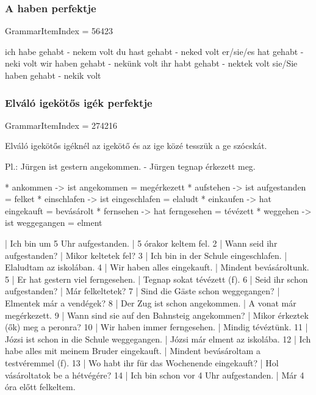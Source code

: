 \documentclass{article}
\newenvironment{desc}{\verbatim}{\endverbatim}
\newenvironment{exmp}{\verbatim}{\endverbatim}
\begin{document}
\subsubsection{A haben perfektje}

GrammarItemIndex = 56423

\begin{desc}

ich habe gehabt - nekem volt
du hast gehabt - neked volt
er/sie/es hat gehabt - neki volt
wir haben gehabt - nekünk volt
ihr habt gehabt - nektek volt
sie/Sie haben gehabt - nekik volt

\end{desc}

\begin{exmp}
\end{exmp}

\subsubsection{Elváló igekötős igék perfektje}

GrammarItemIndex = 274216

\begin{desc}
Elváló igekötős igéknél az igekötő és az ige közé tesszük a ge szócskát.

Pl.: Jürgen ist gestern angekommen. - Jürgen tegnap érkezett meg.

* ankommen -> ist angekommen = megérkezett
* aufstehen -> ist aufgestanden = felket
* einschlafen -> ist eingeschlafen = elaludt
* einkaufen -> hat eingekauft = bevásárolt
* fernsehen -> hat ferngesehen = tévézett
* weggehen -> ist weggegangen = elment
\end{desc}

\begin{exmp}
1 | Ich bin um 5 Uhr aufgestanden. | 5 órakor keltem fel.
2 | Wann seid ihr aufgestanden? | Mikor keltetek fel?
3 | Ich bin in der Schule eingeschlafen. | Elaludtam az iskolában.
4 | Wir haben alles eingekauft. | Mindent bevásároltunk.
5 | Er hat gestern viel ferngesehen. | Tegnap sokat tévézett (f).
6 | Seid ihr schon aufgestanden? | Már felkeltetek?
7 | Sind die Gäste schon weggegangen? | Elmentek már a vendégek?
8 | Der Zug ist schon angekommen. | A vonat már megérkezett.
9 | Wann sind sie auf den Bahnsteig angekommen? | Mikor érkeztek (ők) meg a peronra?
10 | Wir haben immer ferngesehen. | Mindig tévéztünk.
11 | Józsi ist schon in die Schule weggegangen. | Józsi már elment az iskolába.
12 | Ich habe alles mit meinem Bruder eingekauft. | Mindent bevásároltam a testvéremmel (f).
13 | Wo habt ihr für das Wochenende eingekauft? | Hol vásároltatok be a hétvégére?
14 | Ich bin schon vor 4 Uhr aufgestanden. | Már 4 óra előtt felkeltem.
\end{exmp}
\end{document}
